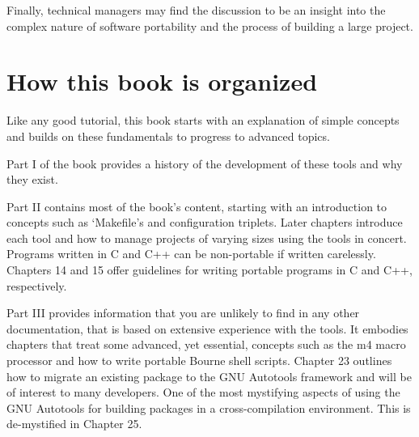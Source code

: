 Finally, technical managers may find the discussion to be an insight into the complex nature of software portability and the process of building a large project. 

\section{How this book is organized}


Like any good tutorial, this book starts with an explanation of simple concepts and builds on these fundamentals to progress to advanced topics. 


Part I of the book provides a history of the development of these tools and why they exist. 


Part II contains most of the book's content, starting with an introduction to concepts such as `Makefile's and configuration triplets. Later chapters introduce each tool and how to manage projects of varying sizes using the tools in concert. Programs written in C and C++ can be non-portable if written carelessly. Chapters 14 and 15 offer guidelines for writing portable programs in C and C++, respectively. 


Part III provides information that you are unlikely to find in any other documentation, that is based on extensive experience with the tools. It embodies chapters that treat some advanced, yet essential, concepts such as the m4 macro processor and how to write portable Bourne shell scripts. Chapter 23 outlines how to migrate an existing package to the GNU Autotools framework and will be of interest to many developers. One of the most mystifying aspects of using the GNU Autotools for building packages in a cross-compilation environment. This is de-mystified in Chapter 25. 
